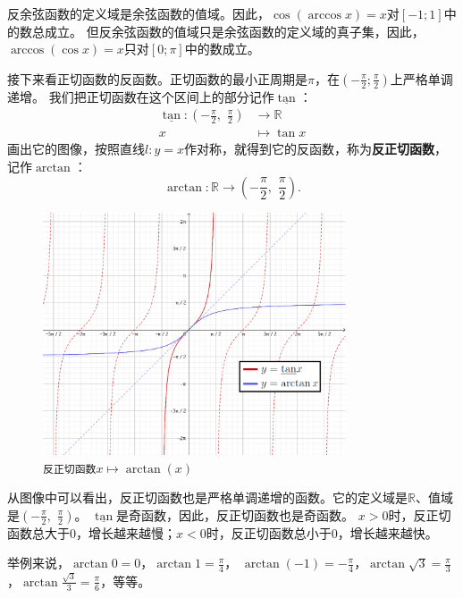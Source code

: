 \documentclass[12pt,UTF8]{ctexbook}
\begin{document}
反余弦函数的定义域是余弦函数的值域。因此，$\cos{(\arccos{x})} = x$对$[-1; 1]$中的数总成立。
但反余弦函数的值域只是余弦函数的定义域的真子集，因此，$\arccos{(\cos{x})} = x$只对$[0;\pi]$中的数成立。

接下来看正切函数的反函数。正切函数的最小正周期是$\pi$，在$(-\frac{\pi}{2}; \frac{\pi}{2})$上严格单调递增。
我们把正切函数在这个区间上的部分记作$\underline{\tan}$：
\begin{align*}
    \underline{\tan} : (-\frac{\pi}{2}, \,\, \frac{\pi}{2}) &\rightarrow \mathbb{R}  \\
                                                          x &\mapsto \tan{x} 
\end{align*}
画出它的图像，按照直线$l: y = x$作对称，就得到它的反函数，称为\textbf{反正切函数}，记作$\arctan$：
$$ \arctan : \mathbb{R} \rightarrow (-\frac{\pi}{2}, \,\, \frac{\pi}{2}) . $$

\begin{figure}[h] %
    \vspace{4pt}
    \centering
    \includegraphics[width=0.8\textwidth]{tu/反正切函数1.png}
    \caption*{\texttt{反正切函数}$x\mapsto \arctan(x)$}
\end{figure}

从图像中可以看出，反正切函数也是严格单调递增的函数。它的定义域是$\mathbb{R}$、值域是$(-\frac{\pi}{2}, \,\, \frac{\pi}{2})$。
$\underline{\tan}$是奇函数，因此，反正切函数也是奇函数。
$x > 0$时，反正切函数总大于$0$，增长越来越慢；$x < 0$时，反正切函数总小于$0$，增长越来越快。

举例来说，$\arctan{0} = 0$，$\arctan{1} = \frac{\pi}{4}$，
$\arctan{(-1)} = -\frac{\pi}{4}$，$\arctan{\sqrt{3}} = \frac{\pi}{3}$，$\arctan{\frac{\sqrt{3}}{3}} = \frac{\pi}{6}$，等等。
\end{document}
